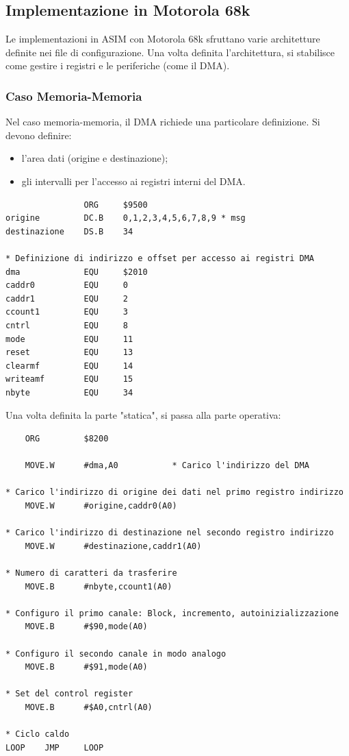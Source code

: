 \newpage

\subsection{Implementazione in Motorola 68k}

Le implementazioni in ASIM con Motorola 68k sfruttano varie architetture definite nei file di configurazione. Una volta definita l'architettura, si stabilisce come gestire i registri e le periferiche (come il DMA). 

\subsubsection{Caso Memoria-Memoria}

Nel caso memoria-memoria, il DMA richiede una particolare definizione. Si devono definire:
\begin{itemize}
    \item l'area dati (origine e destinazione);
    \item gli intervalli per l'accesso ai registri interni del DMA.
\end{itemize}

\begin{lstlisting}
                ORG     $9500
origine         DC.B    0,1,2,3,4,5,6,7,8,9 * msg
destinazione    DS.B    34

* Definizione di indirizzo e offset per accesso ai registri DMA
dma             EQU     $2010
caddr0          EQU     0
caddr1          EQU     2
ccount1         EQU     3
cntrl           EQU     8
mode            EQU     11
reset           EQU     13
clearmf         EQU     14
writeamf        EQU     15
nbyte           EQU     34
\end{lstlisting}

Una volta definita la parte "statica", si passa alla parte operativa:

\begin{lstlisting}
    ORG         $8200 

    MOVE.W      #dma,A0           * Carico l'indirizzo del DMA

* Carico l'indirizzo di origine dei dati nel primo registro indirizzo
    MOVE.W      #origine,caddr0(A0)

* Carico l'indirizzo di destinazione nel secondo registro indirizzo
    MOVE.W      #destinazione,caddr1(A0)

* Numero di caratteri da trasferire
    MOVE.B      #nbyte,ccount1(A0)

* Configuro il primo canale: Block, incremento, autoinizializzazione
    MOVE.B      #$90,mode(A0)

* Configuro il secondo canale in modo analogo
    MOVE.B      #$91,mode(A0)

* Set del control register
    MOVE.B      #$A0,cntrl(A0)

* Ciclo caldo
LOOP    JMP     LOOP
\end{lstlisting}

